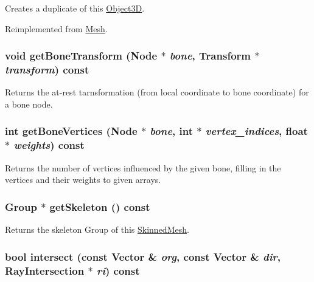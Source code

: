 Creates a duplicate of this \hyperlink{classm3g_1_1Object3D}{Object3D}. 

Reimplemented from \hyperlink{classm3g_1_1Mesh_52ce6d0b3eda2bd3a95bfb5b7dbb6f82}{Mesh}.\hypertarget{classm3g_1_1SkinnedMesh_e6c2fed8109053ded845e49f5c3b0c73}{
\subsubsection[{getBoneTransform}]{\setlength{\rightskip}{0pt plus 5cm}void getBoneTransform ({\bf Node} $\ast$ {\em bone}, \/  {\bf Transform} $\ast$ {\em transform}) const}}
\label{classm3g_1_1SkinnedMesh_e6c2fed8109053ded845e49f5c3b0c73}


Returns the at-rest tarnsformation (from local coordinate to bone coordinate) for a bone node. \hypertarget{classm3g_1_1SkinnedMesh_84ec0935b92b7ccc0aed7e66c4eac78f}{
\subsubsection[{getBoneVertices}]{\setlength{\rightskip}{0pt plus 5cm}int getBoneVertices ({\bf Node} $\ast$ {\em bone}, \/  int $\ast$ {\em vertex\_\-indices}, \/  float $\ast$ {\em weights}) const}}
\label{classm3g_1_1SkinnedMesh_84ec0935b92b7ccc0aed7e66c4eac78f}


Returns the number of vertices influenced by the given bone, filling in the vertices and their weights to given arrays. \hypertarget{classm3g_1_1SkinnedMesh_ce7d69c2b600f6f01a46214db28e6f92}{
\subsubsection[{getSkeleton}]{\setlength{\rightskip}{0pt plus 5cm}Group $\ast$ getSkeleton () const}}
\label{classm3g_1_1SkinnedMesh_ce7d69c2b600f6f01a46214db28e6f92}


Returns the skeleton Group of this \hyperlink{classm3g_1_1SkinnedMesh}{SkinnedMesh}. \hypertarget{classm3g_1_1SkinnedMesh_dc812d8230f94f0b6b8e4fecdb802a16}{
\subsubsection[{intersect}]{\setlength{\rightskip}{0pt plus 5cm}bool intersect (const {\bf Vector} \& {\em org}, \/  const {\bf Vector} \& {\em dir}, \/  {\bf RayIntersection} $\ast$ {\em ri}) const}}
\label{classm3g_1_1SkinnedMesh_dc812d8230f94f0b6b8e4fecdb802a16}


